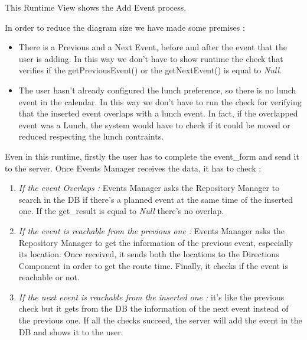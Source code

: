 This Runtime View shows the Add Event process.\par
In order to reduce the diagram size we have made some premises :
\begin{itemize}
	\setlength{\leftskip}{1cm}
	\item There is a Previous and a Next Event, before and after the event that the user is adding. In this way we don’t have to show runtime the check that verifies if the getPreviousEvent() or the getNextEvent() is equal to \emph{Null}.
	\item The user hasn’t already configured the lunch preference, so there is no lunch event in the calendar. In this way we don’t have to run the check for verifying that the inserted event overlaps with a lunch event. In fact, if the overlapped event was a Lunch, the system would have to check if it could be moved or reduced respecting the lunch contraints.
\end{itemize}\par
Even in this runtime, firstly the user has to complete the event\_form and send it to the server.
Once Events Manager receives the data, it has to check :
\begin{enumerate}
	\setlength{\leftskip}{1cm}
	\item \emph{If the event Overlaps :} Events Manager asks the Repository Manager to search in the DB if there’s a planned event at the same time of the inserted one. If the get\_result is equal to \emph{Null} there’s no overlap.
	\item \emph{If the event is reachable from the previous one :} Events Manager asks the Repository Manager to get the information of the previous event, especially its location. Once received, it sends both the locations to the Directions Component in order to get the route time. Finally, it checks if the event is reachable or not.
	\item \emph{If the next event is reachable from the inserted one :} it’s like the previous check but it gets from the DB the information of the next event instead of the previous one.
	If all the checks succeed, the server will add the event in the DB and shows it to the user.
\end{enumerate}
